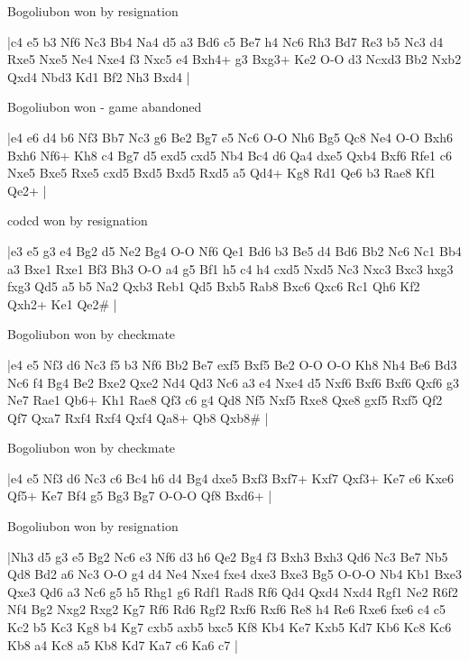 \showboard

Bogoliubon won by resignation

\makegametitle
|c4 e5 b3 Nf6 Nc3 Bb4 Na4 d5 a3 Bd6 c5 Be7 h4 Nc6 Rh3 Bd7 Re3 b5 Nc3 d4 Rxe5 Nxe5 Ne4 Nxe4 f3 Nxc5 e4 Bxh4+ g3 Bxg3+ Ke2 O-O d3 Ncxd3 Bb2 Nxb2 Qxd4 Nbd3 Kd1 Bf2 Nh3 Bxd4  |

\showboard

Bogoliubon won - game abandoned

\makegametitle
|e4 e6 d4 b6 Nf3 Bb7 Nc3 g6 Be2 Bg7 e5 Nc6 O-O Nh6 Bg5 Qc8 Ne4 O-O Bxh6 Bxh6 Nf6+ Kh8 c4 Bg7 d5 exd5 cxd5 Nb4 Bc4 d6 Qa4 dxe5 Qxb4 Bxf6 Rfe1 c6 Nxe5 Bxe5 Rxe5 cxd5 Bxd5 Bxd5 Rxd5 a5 Qd4+ Kg8 Rd1 Qe6 b3 Rae8 Kf1 Qe2+  |

\showboard

codcd won by resignation

\makegametitle
|e3 e5 g3 e4 Bg2 d5 Ne2 Bg4 O-O Nf6 Qe1 Bd6 b3 Be5 d4 Bd6 Bb2 Nc6 Nc1 Bb4 a3 Bxe1 Rxe1 Bf3 Bh3 O-O a4 g5 Bf1 h5 c4 h4 cxd5 Nxd5 Nc3 Nxc3 Bxc3 hxg3 fxg3 Qd5 a5 b5 Na2 Qxb3 Reb1 Qd5 Bxb5 Rab8 Bxc6 Qxc6 Rc1 Qh6 Kf2 Qxh2+ Ke1 Qe2\#  |

\showboard

Bogoliubon won by checkmate

\makegametitle
|e4 e5 Nf3 d6 Nc3 f5 b3 Nf6 Bb2 Be7 exf5 Bxf5 Be2 O-O O-O Kh8 Nh4 Be6 Bd3 Nc6 f4 Bg4 Be2 Bxe2 Qxe2 Nd4 Qd3 Nc6 a3 e4 Nxe4 d5 Nxf6 Bxf6 Bxf6 Qxf6 g3 Ne7 Rae1 Qb6+ Kh1 Rae8 Qf3 c6 g4 Qd8 Nf5 Nxf5 Rxe8 Qxe8 gxf5 Rxf5 Qf2 Qf7 Qxa7 Rxf4 Rxf4 Qxf4 Qa8+ Qb8 Qxb8\#  |

\showboard

Bogoliubon won by checkmate

\makegametitle
|e4 e5 Nf3 d6 Nc3 c6 Bc4 h6 d4 Bg4 dxe5 Bxf3 Bxf7+ Kxf7 Qxf3+ Ke7 e6 Kxe6 Qf5+ Ke7 Bf4 g5 Bg3 Bg7 O-O-O Qf8 Bxd6+  |

\showboard

Bogoliubon won by resignation

\makegametitle
|Nh3 d5 g3 e5 Bg2 Nc6 e3 Nf6 d3 h6 Qe2 Bg4 f3 Bxh3 Bxh3 Qd6 Nc3 Be7 Nb5 Qd8 Bd2 a6 Nc3 O-O g4 d4 Ne4 Nxe4 fxe4 dxe3 Bxe3 Bg5 O-O-O Nb4 Kb1 Bxe3 Qxe3 Qd6 a3 Nc6 g5 h5 Rhg1 g6 Rdf1 Rad8 Rf6 Qd4 Qxd4 Nxd4 Rgf1 Ne2 R6f2 Nf4 Bg2 Nxg2 Rxg2 Kg7 Rf6 Rd6 Rgf2 Rxf6 Rxf6 Re8 h4 Re6 Rxe6 fxe6 c4 c5 Kc2 b5 Kc3 Kg8 b4 Kg7 cxb5 axb5 bxc5 Kf8 Kb4 Ke7 Kxb5 Kd7 Kb6 Kc8 Kc6 Kb8 a4 Kc8 a5 Kb8 Kd7 Ka7 c6 Ka6 c7  |

